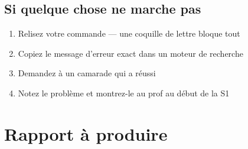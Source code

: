 \documentclass[11pt,a4paper]{article}
\begin{document}
\subsection{Si quelque chose ne marche pas}

\begin{infobox}
\begin{enumerate}[nosep]
    \item Relisez votre commande --- une coquille de lettre bloque tout
    \item Copiez le message d'erreur exact dans un moteur de recherche
    \item Demandez à un camarade qui a réussi
    \item Notez le problème et montrez-le au prof au début de la S1
\end{enumerate}
\end{infobox}

\newpage

\section{Rapport à produire}
\end{document}

